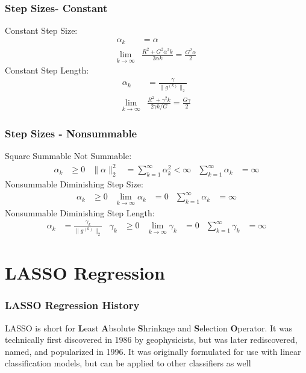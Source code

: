 \documentclass{beamer}
\begin{document}
\begin{frame}
\frametitle{Step Sizes- Constant}
Constant Step Size:
\begin{equation}\label{eq:constant step size}
\begin{aligned}
\alpha_{k} &= \alpha \\
\lim_{k \rightarrow \infty} &\frac{R^2  + G^2 \alpha^2 k}{2\alpha k} = \frac{G^2 \alpha}{2}
\end{aligned}
\end{equation}
Constant Step Length:
\begin{equation}\label{eq:constant step length}
\begin{aligned}
\alpha_k &= \frac{\gamma}{\|g^{(k)}\|_2} \\
\lim_{k \rightarrow \infty} &\frac{R^2  + \gamma^2 k}{2\gamma k / G} = \frac{G \gamma}{2}
\end{aligned}
\end{equation}
\end{frame}

\begin{frame}
\frametitle{Step Sizes - Nonsummable}
Square Summable Not Summable:
\begin{equation}\label{eq:square summable not summable}
\begin{aligned}
\alpha_k &\geq 0 & \|\alpha\|^2_2&= \sum_{k=1}^{\infty} \alpha_k^2 < \infty & \sum_{k=1}^{\infty} \alpha_k &= \infty
\end{aligned}
\end{equation}
Nonsummable Diminishing Step Size:
\begin{equation}\label{eq:nonsummable diminishing step size}
\begin{aligned}
\alpha_k &\geq 0 & 
\lim_{k \rightarrow \infty} \alpha_k &= 0 & 
\sum_{k=1}^{\infty} \alpha_k &= \infty
\end{aligned}
\end{equation}
Nonsummable Diminishing Step Length:
\begin{equation}\label{eq:nonsummable diminishing step length}
\begin{aligned}
\alpha_k &= \frac{\gamma_k}{\|g^{(k)}\|_2} &
\gamma_k &\geq 0 & 
\lim_{k \rightarrow \infty} \gamma_k &= 0 & 
\sum_{k=1}^{\infty} \gamma_k &= \infty
\end{aligned}
\end{equation}
\end{frame}

\section{LASSO Regression}
\begin{frame}
\frametitle{LASSO Regression History}
LASSO is short for \textbf{L}east \textbf{A}bsolute \textbf{S}hrinkage and \textbf{S}election \textbf{O}perator. It was technically first discovered in 1986 by geophysicists, but was later rediscovered, named, and popularized in 1996. It was originally formulated for use with linear classification models, but can be applied to other classifiers as well \cite{lassooriginal} \cite{lassopaper} \\
\end{frame}
\end{document}
